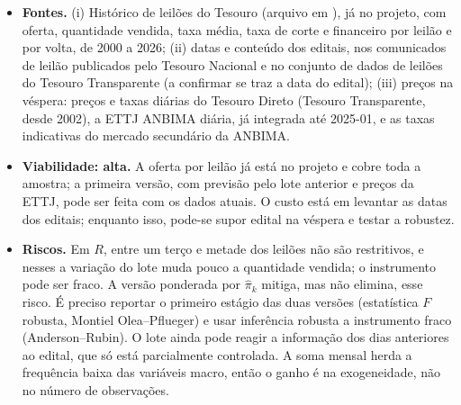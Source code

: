 \documentclass[12pt,a4paper]{article}
\begin{document}
\begin{itemize}[leftmargin=1.2cm]
    \item \textbf{Fontes.} (i) Histórico de leilões do Tesouro
    (arquivo  em ), já no projeto, com oferta,
    quantidade vendida, taxa média, taxa de corte e financeiro por leilão e por
    volta, de 2000 a 2026; (ii) datas e conteúdo dos editais, nos comunicados de
    leilão publicados pelo Tesouro Nacional e no conjunto de dados de leilões do
    Tesouro Transparente (a confirmar se traz a data do edital); (iii) preços na
    véspera: preços e taxas diárias do Tesouro Direto (Tesouro Transparente, desde
    2002), a ETTJ ANBIMA diária, já integrada até 2025-01, e as taxas indicativas
    do mercado secundário da ANBIMA.
    \item \textbf{Viabilidade: alta.} A oferta por leilão já está no projeto e cobre
    toda a amostra; a primeira versão, com previsão pelo lote anterior e preços da
    ETTJ, pode ser feita com os dados atuais. O custo está em levantar as datas dos
    editais; enquanto isso, pode-se supor edital na véspera e testar a robustez.
    \item \textbf{Riscos.} Em \(R\), entre um terço e metade dos leilões não são
    restritivos, e nesses a variação do lote muda pouco a quantidade vendida; o
    instrumento pode ser fraco. A versão ponderada por \(\hat\pi_k\) mitiga, mas não
    elimina, esse risco. É
    preciso reportar o primeiro estágio das duas versões (estatística \(F\) robusta,
    Montiel Olea--Pflueger) e usar inferência robusta a instrumento fraco
    (Anderson--Rubin).
    O lote ainda pode reagir a informação dos dias anteriores ao edital, que só
    está parcialmente controlada. A soma mensal herda a frequência baixa das
    variáveis macro, então o ganho é na exogeneidade, não no número de
    observações.
\end{itemize}
\end{document}
